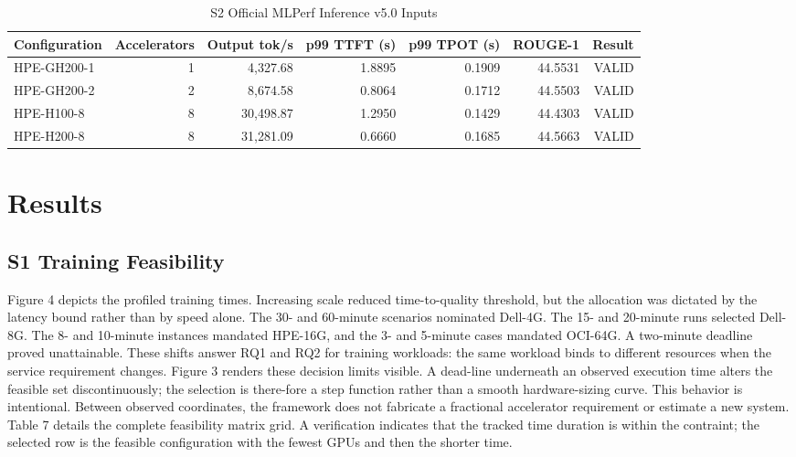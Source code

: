 \documentclass[final,3p,12pt,nopreprintline]{elsarticle}
\begin{document}
\begin{table}[htbp]
\caption{S2 Official MLPerf Inference v5.0 Inputs}
\label{tab:s2configs}
\centering
\footnotesize
\setlength{\tabcolsep}{3pt}
\renewcommand{\arraystretch}{1.08}
\begin{adjustbox}{max width=\linewidth}
\begin{tabular}{lrrrrrr}
\toprule
\textbf{Configuration} & \textbf{Accelerators} & \textbf{Output tok/s} & \textbf{p99 TTFT (s)} & \textbf{p99 TPOT (s)} & \textbf{ROUGE-1} & \textbf{Result}\\
\midrule
HPE-GH200-1 & 1 & 4,327.68 & 1.8895 & 0.1909 & 44.5531 & VALID\\
HPE-GH200-2 & 2 & 8,674.58 & 0.8064 & 0.1712 & 44.5503 & VALID\\
HPE-H100-8 & 8 & 30,498.87 & 1.2950 & 0.1429 & 44.4303 & VALID\\
HPE-H200-8 & 8 & 31,281.09 & 0.6660 & 0.1685 & 44.5663 & VALID\\
\bottomrule
\end{tabular}
\end{adjustbox}
\end{table}

\section{Results}


\subsection{S1 Training Feasibility}


Figure 4 depicts the profiled training times. Increasing scale reduced time-to-quality threshold, but the  allocation was dictated by the latency bound rather than by speed alone. The 30- and 60-minute scenarios nominated Dell-4G. The 15- and 20-minute runs selected Dell-8G. The 8- and 10-minute instances mandated HPE-16G, and the 3- and 5-minute cases mandated OCI-64G. A two-minute deadline proved unattainable. These shifts answer RQ1 and RQ2 for training workloads: the same workload binds to different resources when the service requirement changes. Figure 3 renders these decision limits visible. A dead-line underneath an observed execution time alters the feasible set discontinuously; the selection is there-fore a step function rather than a smooth hardware-sizing curve. This behavior is intentional. Between observed coordinates, the framework does not fabricate a fractional accelerator requirement or estimate a new system. Table 7 details the complete feasibility matrix grid. A verification indicates that the tracked time duration is within the contraint; the selected row is the feasible configuration with the fewest GPUs and then the shorter time.
\end{document}

